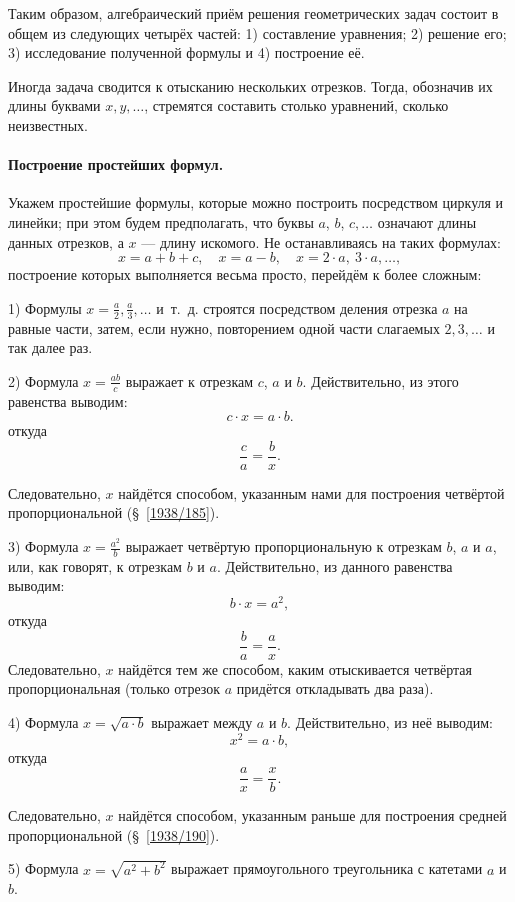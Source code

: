 \documentclass[oneside]{book}
\begin{document}
Таким образом, алгебраический приём решения геометрических задач состоит в общем из следующих четырёх частей:
1) составление уравнения;
2) решение его;
3) исследование полученной формулы и 4) построение её.

Иногда задача сводится к отысканию нескольких отрезков.
Тогда, обозначив их длины буквами $x,y,\dots$, стремятся составить столько уравнений, сколько неизвестных.

\paragraph{Построение простейших формул.}\label{1938/211}
Укажем простейшие формулы, которые можно построить посредством циркуля и линейки;
при этом будем предполагать, что буквы $a$, $b$, $c,\dots$
означают длины данных отрезков, а $x$ — длину искомого.
Не останавливаясь на таких формулах:
\[x=a+b+c,
 \quad
 x=a-b,
 \quad
 x=2\cdot a,\ 3\cdot a,\dots,
\]
построение которых выполняется весьма просто, перейдём к более сложным:


1) Формулы $x=\frac a2, \frac a3,\dots$ и~т.~д. строятся посредством деления отрезка $a$ на равные части, затем, если нужно, повторением одной части слагаемых $2, 3,\dots$ и так далее раз.

2) Формула $x=\frac{ab}c$ выражает  к отрезкам $c$, $a$ и $b$.
Действительно, из этого равенства выводим:
\[c\cdot x=a\cdot b.\]
откуда
\[\frac ca=\frac bx.\]

Следовательно, $x$ найдётся способом, указанным нами для построения четвёртой пропорциональной (§~\ref{1938/185}).

3) Формула $x=\frac{a^2}b$ выражает четвёртую пропорциональную к отрезкам $b$, $a$ и $a$, или, как говорят,  к отрезкам $b$ и $a$.
Действительно, из данного равенства выводим:
\[b\cdot x=a^2,\]
откуда
\[\frac ba=\frac ax.\]
Следовательно, $x$ найдётся тем же способом, каким отыскивается четвёртая пропорциональная (только отрезок $a$ придётся откладывать два раза).

4) Формула $x=\sqrt{a\cdot b}$ выражает  между $a$ и $b$.
Действительно, из неё выводим:
\[x^2=a\cdot b,\]
откуда
\[\frac ax=\frac xb.\]

Следовательно, $x$ найдётся способом, указанным раньше для построения средней пропорциональной (§~\ref{1938/190}).

5) Формула $x=\sqrt{a^2+b^2}$ выражает  прямоугольного треугольника с катетами $a$ и $b$.
\end{document}
